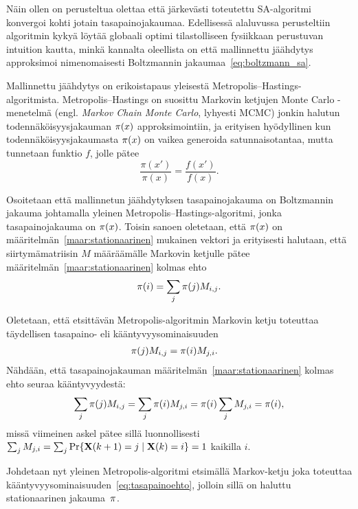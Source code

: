 Näin ollen on perusteltua olettaa että järkevästi toteutettu SA-algoritmi konvergoi kohti jotain tasapainojakaumaa.
Edellisessä alaluvussa perusteltiin algoritmin kykyä löytää globaali optimi
tilastolliseen fysiikkaan perustuvan intuition kautta,
minkä kannalta oleellista on että mallinnettu jäähdytys approksimoi nimenomaisesti Boltzmannin jakaumaa~\eqref{eq:boltzmann_sa}.

Mallinnettu jäähdytys on erikoistapaus yleisestä Metropolis--Hastings-algo\-rit\-mista.
Metropolis--Hastings on suosittu Markovin ketjujen Monte Carlo -menetelmä (engl. \emph{Markov Chain Monte Carlo}, lyhyesti MCMC)  jonkin halutun todennäköisyysjakauman $\mathbf{\pi}(x)$ approksimointiin,
ja erityisen hyödyllinen kun todennäköisyysjakaumasta $\mathbf{\pi}(x)$ on vaikea generoida satunnaisotantaa, mutta tunnetaan funktio $f$, jolle pätee
\begin{equation}
    \frac{\pi(x')}{\pi(x)} = \frac{f(x')}{f(x)}.
\end{equation}

Osoitetaan että mallinnetun jäähdytyksen tasapainojakauma on Boltzmannin jakauma johtamalla yleinen Metropolis--Hastings-algoritmi,
jonka tasapainojakauma on $\mathbf{\pi}(x)$.
Toisin sanoen oletetaan, että $\mathbf{\pi}(x)$ on määritelmän~\ref{maar:stationaarinen} mukainen vektori ja erityisesti halutaan, että siirtymämatriisin $M$ määräämälle Markovin ketjulle pätee määritelmän~\ref{maar:stationaarinen} kolmas ehto
\begin{equation}
    \mathbf{\pi}(i) = \sum_j \mathbf{\pi}(j) M_{i,j}.
\end{equation}

Oletetaan, että etsittävän Metropolis-algoritmin Markovin ketju toteuttaa täydellisen tasapaino- eli kääntyvyysominaisuuden
\begin{align}
    \label{eq:tasapainoehto}
    \mathbf{\pi}(j) M_{i,j} &= \mathbf{\pi}(i) M_{j,i}.
\end{align}
Nähdään, että tasapainojakauman määritelmän~\ref{maar:stationaarinen} kolmas ehto seuraa kääntyvyydestä:
\begin{equation}
    \sum_j \mathbf{\pi}(j) M_{i,j} = \sum_j \mathbf{\pi}(i) M_{j,i}
                                 = \mathbf{\pi}(i) \sum_j M_{j,i}
                                 = \mathbf{\pi}(i), \label{eq:station_johto}
\end{equation}
missä viimeinen askel pätee sillä luonnollisesti $\sum_j M_{j,i} = \sum_j \Pr\{ \mathbf{X}(k+1) = j \mid \mathbf{X}(k) = i \} = 1$ kaikilla $i$.

Johdetaan nyt yleinen Metropolis-algoritmi etsimällä Markov-ketju joka toteuttaa kääntyvyysominaisuuden~\eqref{eq:tasapainoehto},
jolloin sillä on haluttu stationaarinen jakauma~$\mathbf{\pi}$.

